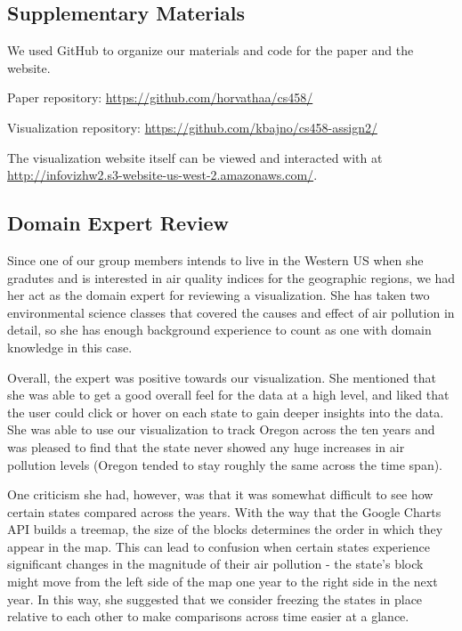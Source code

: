 \documentclass[journal]{vgtc}                %
\begin{document}
\subsection{Supplementary Materials}

We used GitHub to organize our materials and code for the paper and the website. 

Paper repository: \url{https://github.com/horvathaa/cs458/}

Visualization repository: \url{https://github.com/kbajno/cs458-assign2/}

The visualization website itself can be viewed and interacted with at 
\url{http://infovizhw2.s3-website-us-west-2.amazonaws.com/}.


\subsection{Domain Expert Review}

Since one of our group members intends to live in the Western US when she gradutes and 
is interested in air quality indices for the geographic regions, we had her act as the 
domain expert for reviewing a visualization. She has taken two environmental science 
classes that covered the causes and effect of air pollution in detail, so she has
enough background experience to count as one with domain knowledge in this case.

Overall, the expert was positive towards our visualization. She mentioned that she was
able to get a good overall feel for the data at a high level, and liked that the user
could click or hover on each state to gain deeper insights into the data. She was able
to use our visualization to track Oregon across the ten years and was pleased to find
that the state never showed any huge increases in air pollution levels (Oregon tended
to stay roughly the same across the time span). 

One criticism she had, however, was that it was somewhat difficult to see how certain 
states compared across the years. With the way that the Google Charts API builds a 
treemap, the size of the blocks determines the order in which they appear in the map. 
This can lead to confusion when certain states experience significant changes in the 
magnitude of their air pollution - the state's block might move from the left side of
the map one year to the right side in the next year. In this way, she suggested that
we consider freezing the states in place relative to each other to make comparisons
across time easier at a glance.
\end{document}
